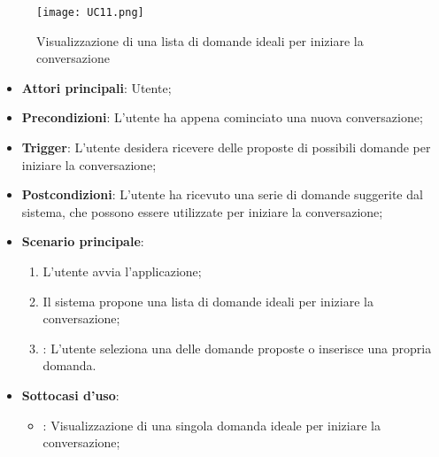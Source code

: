 \begin{figure}[h]
    \centering
    \texttt{[image: UC11.png]}
    \caption{Visualizzazione di una lista di domande ideali per iniziare la conversazione}
\end{figure}

\begin{itemize}
    \item \textbf{Attori principali}: Utente;
    \item \textbf{Precondizioni}: L'utente ha appena cominciato una nuova conversazione;
    \item \textbf{Trigger}: L'utente desidera ricevere delle proposte di possibili domande per iniziare la conversazione;
    \item \textbf{Postcondizioni}: L'utente ha ricevuto una serie di domande suggerite dal sistema, che possono essere utilizzate per iniziare la conversazione;
    \item \textbf{Scenario principale}:
    \begin{enumerate}
        \item L'utente avvia l'applicazione;
        \item Il sistema propone una lista di domande ideali per iniziare la conversazione;
        \item {}: L'utente seleziona una delle domande proposte o inserisce una propria domanda.
    \end{enumerate}
    \item \textbf{Sottocasi d'uso}:
    \begin{itemize}
        \item {}: Visualizzazione di una singola domanda ideale per iniziare la conversazione;
    \end{itemize}
\end{itemize}

\hypertarget{UC11.1}{}
